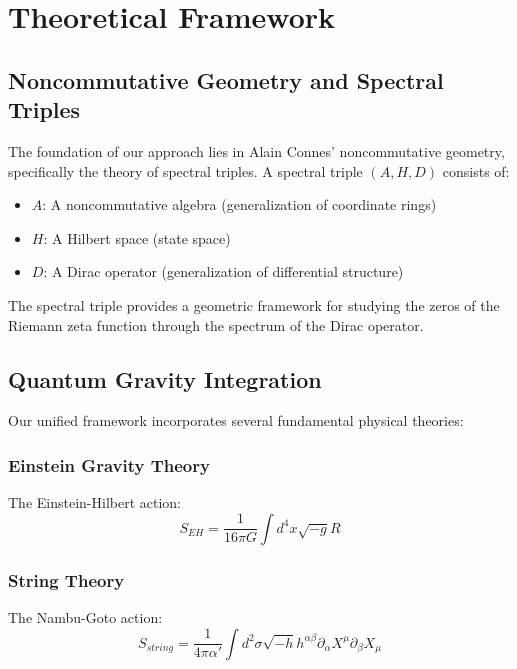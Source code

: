 \documentclass[12pt]{article}
\begin{document}
\section{Theoretical Framework}

\subsection{Noncommutative Geometry and Spectral Triples}

The foundation of our approach lies in Alain Connes' noncommutative geometry, specifically the theory of spectral triples. A spectral triple $(A, H, D)$ consists of:

\begin{itemize}
\item $A$: A noncommutative algebra (generalization of coordinate rings)
\item $H$: A Hilbert space (state space)
\item $D$: A Dirac operator (generalization of differential structure)
\end{itemize}

The spectral triple provides a geometric framework for studying the zeros of the Riemann zeta function through the spectrum of the Dirac operator.

\subsection{Quantum Gravity Integration}

Our unified framework incorporates several fundamental physical theories:

\subsubsection{Einstein Gravity Theory}
The Einstein-Hilbert action:
\begin{equation}
S_{EH} = \frac{1}{16\pi G} \int d^4x \sqrt{-g} R
\end{equation}

\subsubsection{String Theory}
The Nambu-Goto action:
\begin{equation}
S_{string} = \frac{1}{4\pi\alpha'} \int d^2\sigma \sqrt{-h} h^{\alpha\beta} \partial_\alpha X^\mu \partial_\beta X_\mu
\end{equation}
\end{document}
